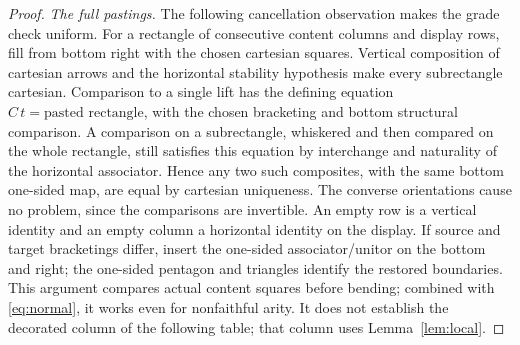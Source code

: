 \documentclass[11pt]{article}
\theoremstyle{definition}\newtheorem{definition}[theorem]{Definition}
\begin{document}
\begin{proof}
\emph{The full pastings.} The following cancellation observation
makes the grade check uniform. For a rectangle of consecutive content
columns and display rows, fill from bottom right with the chosen
cartesian squares. Vertical composition of cartesian arrows and the
horizontal stability hypothesis make every subrectangle cartesian.
Comparison to a single lift has the defining equation
$C\,t=\text{pasted rectangle}$, with the chosen bracketing and
bottom structural comparison. A comparison on a subrectangle,
whiskered and then compared on the whole rectangle, still satisfies
this equation by interchange and naturality of the horizontal
associator. Hence any two such composites, with the same
bottom one-sided map, are equal by cartesian uniqueness.
The converse orientations cause no problem, since the comparisons
are invertible. An empty row is a vertical identity and an empty
column a horizontal identity on the display. If source and target
bracketings differ, insert the one-sided associator/unitor on the
bottom and right; the one-sided pentagon and triangles identify
the restored boundaries. This argument compares actual content
squares before bending; combined with \eqref{eq:normal}, it works
even for nonfaithful arity. It does not establish the decorated
column of the following table; that column uses Lemma~\ref{lem:local}.


\end{proof}
\end{document}
